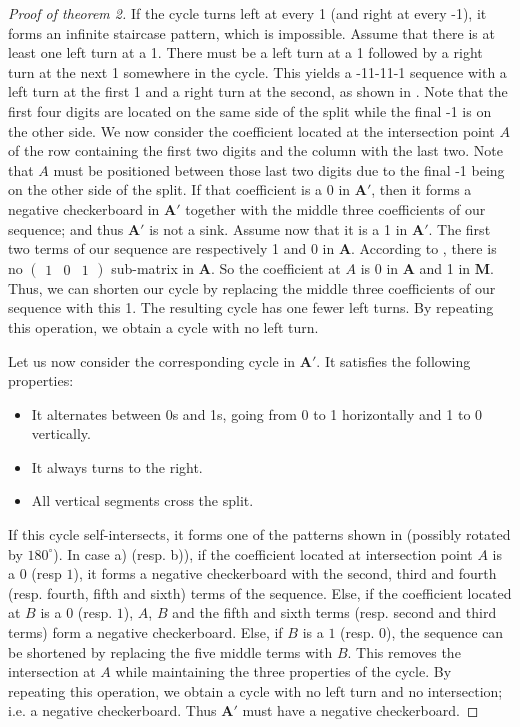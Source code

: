 \documentclass{article}
\newcommand{\A}{\mathbf A}
\newcommand{\M}{\mathbf M}
\begin{document}
\begin{proof}[Proof of theorem 2]
If the cycle turns left at every 1 (and right at every -1), it forms an infinite staircase pattern, which is impossible. Assume that there is at least one left turn at a 1. There must be a left turn at a 1 followed by a right turn at the next 1 somewhere in the cycle. This yields a -11-11-1 sequence with a left turn at the first 1 and a right turn at the second, as shown in . Note that the first four digits are located on the same side of the split while the final -1 is on the other side. We now consider the coefficient located at the intersection point $A$ of the row containing the first two digits and the column with the last two. Note that $A$ must be positioned between those last two digits due to the final -1 being on the other side of the split. If that coefficient is a 0 in $\A'$, then it forms a negative checkerboard in $\A'$ together with the middle three coefficients of our sequence; and thus $\A'$ is not a sink. Assume now that it is a 1 in $\A'$. The first two terms of our sequence are respectively 1 and 0 in $\A$. According to , there is no $\begin{pmatrix}
1 & 0 & 1
\end{pmatrix}$ sub-matrix in $\A$. So the coefficient at $A$ is 0 in $\A$ and 1 in $\M$. Thus, we can shorten our cycle by replacing the middle three coefficients of our sequence with this 1. The resulting cycle has one fewer left turns. By repeating this operation, we obtain a cycle with no left turn.


Let us now consider the corresponding cycle in $\A'$. It satisfies the following properties:
\begin{itemize}
    \item It alternates between 0s and 1s, going from 0 to 1 horizontally and 1 to 0 vertically.
    \item It always turns to the right.
    \item All vertical segments cross the split.
\end{itemize}


If this cycle self-intersects, it forms one of the patterns shown in  (possibly rotated by $180^{\circ}$). In case a) (resp. b)), if the coefficient located at intersection point $A$ is a $0$ (resp $1$), it forms a negative checkerboard with the second, third and fourth (resp. fourth, fifth and sixth) terms of the sequence. Else, if the coefficient located at $B$ is a $0$ (resp. $1$), $A$, $B$ and the fifth and sixth terms (resp. second and third terms) form a negative checkerboard. Else, if $B$ is a $1$ (resp. $0$), the sequence can be shortened by replacing the five middle terms with $B$. This removes the intersection at $A$ while maintaining the three properties of the cycle. By repeating this operation, we obtain a cycle with no left turn and no intersection; i.e. a negative checkerboard. Thus $\A'$ must have a negative checkerboard.



\end{proof}
\end{document}
